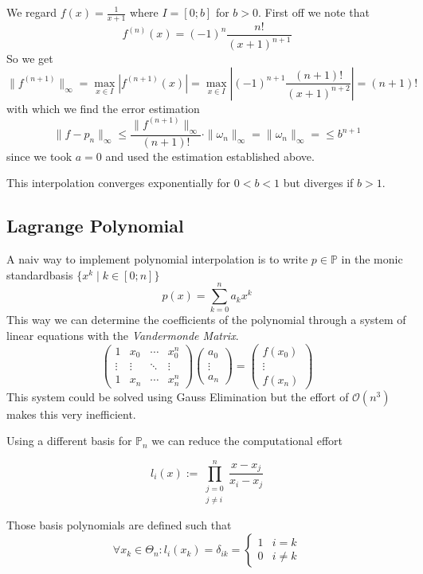 \begin{example}
   We regard \(f(x) = \frac{1}{x + 1}\) where \(I = [0; b]\) for \(b > 0\).
   First off we note that
   \[f^{(n)}(x) = (-1)^n \frac{n!}{(x+1)^{n+1}}\]
   So we get
   \[\|f^{(n+1)}\|_\infty = \max_{x \in I}|f^{(n+1)}(x)| = \max_{x \in I} \left| (-1)^{n+1} \frac{(n+1)!}{(x+1)^{n+2}}\right| = (n+1)!\]
   with which we find the error estimation
   \[\|f - p_n\|_\infty \leq \frac{\|f^{(n+1)}\|_\infty}{(n+1)!} \cdot \|\omega_n\|_\infty = \|\omega_n\|_\infty  = \leq b^{n+1}\]
   since we took \(a = 0\) and used the estimation established above.

   This interpolation converges exponentially for \(0 < b < 1\) but diverges if \(b > 1\).
\end{example}

\subsection{Lagrange Polynomial}
A naiv way to implement polynomial interpolation is to write \(p \in \mathbb{P}\) in the monic standardbasis \(\{x^k \mid k \in [0; n]\}\)
\[p(x) = \sum_{k=0}^n a_k x^k\]
This way we can determine the coefficients of the polynomial through a system of linear equations with the \emph{Vandermonde Matrix}.
\[\begin{pmatrix}
      1 & x_0 & \cdots & x_0^n\\
      \vdots & \vdots & \ddots & \vdots\\
      1 & x_n & \cdots & x_n^n
  \end{pmatrix} \begin{pmatrix}a_0\\ \vdots\\ a_n\end{pmatrix} = \begin{pmatrix}f(x_0)\\ \vdots\\ f(x_n)\end{pmatrix}\]
This system could be solved using Gauss Elimination but the effort of \(\mathcal{O}(n^3)\) makes this very inefficient.

Using a different basis for \(\mathbb{P}_n\) we can reduce the computational effort
\begin{definition}\label{def:lagrange_basis}
   \[l_i(x) := \prod_{\substack{j = 0\\ j \neq i}}^n \frac{x - x_j}{x_i - x_j}\]
\end{definition}
\begin{remark}
   Those basis polynomials are defined such that
   \[\forall x_k \in \Theta_n: l_i(x_k) = \delta_{ik} = \begin{cases}1 & i = k\\0 & i \neq k\end{cases}\]
\end{remark}

